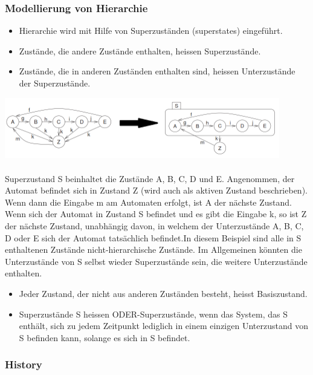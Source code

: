 {\subsubsection{Modellierung von Hierarchie}
\begin{itemize}
  \item Hierarchie wird mit Hilfe von Superzuständen (superstates) eingeführt.
  \item Zustände, die andere Zustände enthalten, heissen Superzustände.
  \item Zustände, die in anderen Zuständen enthalten sind, heissen Unterzustände der Superzustände.
\end{itemize}
\includegraphics[width = 12cm]{images/FSM/Hierarchie}\\\\
Superzustand S beinhaltet die Zustände A, B, C, D und E. Angenommen, der Automat beﬁndet sich in Zustand Z (wird auch als aktiven Zustand beschrieben). Wenn dann die Eingabe m am Automaten erfolgt, ist A der nächste Zustand. Wenn sich der Automat in Zustand S beﬁndet und es gibt die Eingabe k, so ist Z der nächste Zustand, unabhängig davon, in welchem
der Unterzustände A, B, C, D oder E sich der Automat tatsächlich beﬁndet.In diesem Beispiel sind alle in S enthaltenen Zustände nicht-hierarchische Zustände. Im Allgemeinen könnten die Unterzustände von S selbst wieder Superzustände sein, die weitere Unterzustände enthalten.
\begin{itemize}
  \item Jeder Zustand, der nicht aus anderen Zuständen besteht, heisst Basiszustand.
  \item Superzustände S heissen ODER-Superzustände, wenn das System, das S enthält, sich zu jedem Zeitpunkt lediglich in einem einzigen Unterzustand von S beﬁnden kann, solange es sich in S beﬁndet.
\end{itemize}
\subsubsection{History}
}
